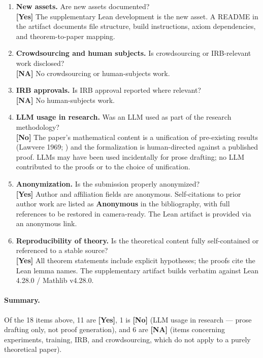 \begin{enumerate}[leftmargin=1.9em,itemsep=0.25em]
\item \textbf{New assets.} Are new assets documented?\\
\textbf{[Yes]} The supplementary Lean development is the new asset. A README in the artifact documents file structure, build instructions, axiom dependencies, and theorem-to-paper mapping.

\item \textbf{Crowdsourcing and human subjects.} Is crowdsourcing or IRB-relevant work disclosed?\\
\textbf{[NA]} No crowdsourcing or human-subjects work.

\item \textbf{IRB approvals.} Is IRB approval reported where relevant?\\
\textbf{[NA]} No human-subjects work.

\item \textbf{LLM usage in research.} Was an LLM used as part of the research methodology?\\
\textbf{[No]} The paper's mathematical content is a unification of pre-existing results (Lawvere 1969; \citealp{yanofsky2003}) and the formalization is human-directed against a published proof. LLMs may have been used incidentally for prose drafting; no LLM contributed to the proofs or to the choice of unification.

\item \textbf{Anonymization.} Is the submission properly anonymized?\\
\textbf{[Yes]} Author and affiliation fields are anonymous. Self-citations to prior author work are listed as \textbf{Anonymous} in the bibliography, with full references to be restored in camera-ready. The Lean artifact is provided via an anonymous link.

\item \textbf{Reproducibility of theory.} Is the theoretical content fully self-contained or referenced to a stable source?\\
\textbf{[Yes]} All theorem statements include explicit hypotheses; the proofs cite the Lean lemma names. The supplementary artifact builds verbatim against Lean 4.28.0 / Mathlib v4.28.0.

\end{enumerate}

\paragraph{Summary.} Of the 18 items above, 11 are \textbf{[Yes]}, 1 is \textbf{[No]} (LLM usage in research --- prose drafting only, not proof generation), and 6 are \textbf{[NA]} (items concerning experiments, training, IRB, and crowdsourcing, which do not apply to a purely theoretical paper).
